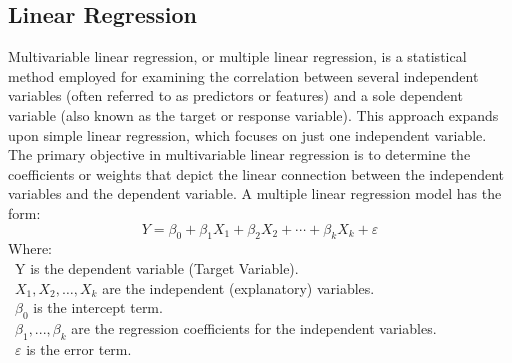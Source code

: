 \documentclass[conference]{IEEEtran}
\begin{document}
\subsection{Linear Regression}
Multivariable linear regression, or multiple linear regression, is a statistical method employed for examining the correlation between several independent variables (often referred to as predictors or features) and a sole dependent variable (also known as the target or response variable). This approach expands upon simple linear regression, which focuses on just one independent variable. The primary objective in multivariable linear regression is to determine the coefficients or weights that depict the linear connection between the independent variables and the dependent variable.
A multiple linear regression model has the form: 
\[Y=\beta_0+\beta_1X_1+\beta_2X_2+\cdots+\beta_kX_k+\varepsilon\]
Where:\\
	\indent\textbullet\ Y is the dependent variable (Target Variable).\\
	\indent\textbullet\ \(X_1, X_2, \ldots, X_k\) are the independent (explanatory) variables.\\
	\indent\textbullet\ \(\beta_0\) is the intercept term.\\
	\indent\textbullet\ \(\beta_1,..., \beta_k\) are the regression coefficients for the independent variables.\\
	\indent\textbullet\ \(\varepsilon\) is the error term.
 
\end{document}
